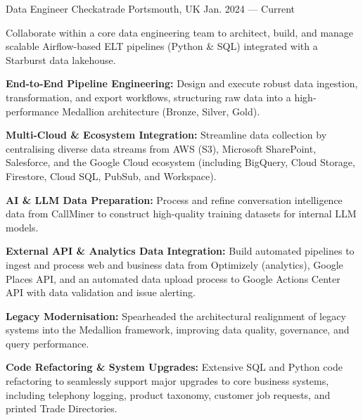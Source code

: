 
\begin{cventries}

  \cventry
  {Data Engineer} %
  {Checkatrade } %
  {Portsmouth, UK} %
  {Jan. 2024 --- Current} %
  {
    \begin{cvitems} %
      \item {Collaborate within a core data engineering team to architect, build, and manage scalable Airflow-based ELT pipelines (Python \& SQL) integrated with a Starburst data lakehouse.}
      \item {\textbf{End-to-End Pipeline Engineering:} Design and execute robust data ingestion, transformation, and export workflows, structuring raw data into a high-performance Medallion architecture (Bronze, Silver, Gold).}
      \item {\textbf{Multi-Cloud \& Ecosystem Integration:} Streamline data collection by centralising diverse data streams  from AWS (S3), Microsoft SharePoint, Salesforce, and the Google Cloud ecosystem (including  BigQuery, Cloud Storage, Firestore, Cloud SQL, PubSub, and Workspace).}
      \item {\textbf{AI \& LLM Data Preparation:} Process and refine conversation intelligence data from CallMiner to construct high-quality training datasets for internal LLM models.}
      \item {\textbf{External API \& Analytics Data Integration:} Build automated pipelines to ingest and process web and  business data from Optimizely (analytics), Google Places API, and an automated data upload process  to Google Actions Center API with data validation and issue alerting.}
      \item {\textbf{Legacy Modernisation:} Spearheaded the architectural realignment of legacy systems into the Medallion framework, improving data quality, governance, and query performance.}
      \item {\textbf{Code Refactoring \& System Upgrades:} Extensive SQL and Python code refactoring to seamlessly support major upgrades to core business systems, including telephony logging, product taxonomy, customer job requests, and printed Trade Directories.}

\end{cvitems}}
\end{cventries}
